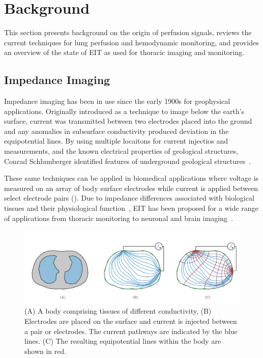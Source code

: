 \chapter{Background}
This section presents background on the 
origin of perfusion signals, reviews the current techniques for lung perfusion and hemodynamic
monitoring, and provides an overview 
of the state of EIT as used for thoracic imaging and monitoring.

\section{Impedance Imaging}
\label{sec:impedance_imaging}
Impedance imaging has been in use since the early 1900s for geophysical applications.  
Originally introduced as a technique to image below the earth’s surface, 
current was transmitted between two electrodes placed into the ground and any 
anomalies in subsurface conductivity produced deviation 
in the equipotential lines. 
By using multiple locaitons for current injectios and measurements, 
and the known 
electrical properties of geological structures, Conrad Schlumberger identified
features of underground geological structures~\parencite{allaud_schlumberger_1977}.

These same techniques can be applied in biomedical applications where
voltage is measured on an array of body surface electrodes 
while current is applied between select electrode pairs (). 
Due to impedance differences associated with biological tissues and their physiological 
function~\parencite{geddes_specific_1967,mcadams_tissue_1995},
EIT has been proposed for a wide range of applications from thoracic monitoring
\parencite{frerichs_chest_2017} to neuronal and 
brain imaging~\parencite{holder_electrical_1992}.

\begin{figure}
    \centering
   \includegraphics[width=\textwidth]{chapter2-background/imgs/current_and_equipotential_lines.pdf}
   \caption[Current and Equipotential lines]{\label{fig:cur_equip_line} 
   (A) A body comprising tissues of different conductivity, (B) Electrodes are placed on the surface 
   and current is injected between a pair or electrodes. The current pathways are indicated 
   by the blue lines. (C) The resulting equipotential lines within the body are shown in red.}
\end{figure}

